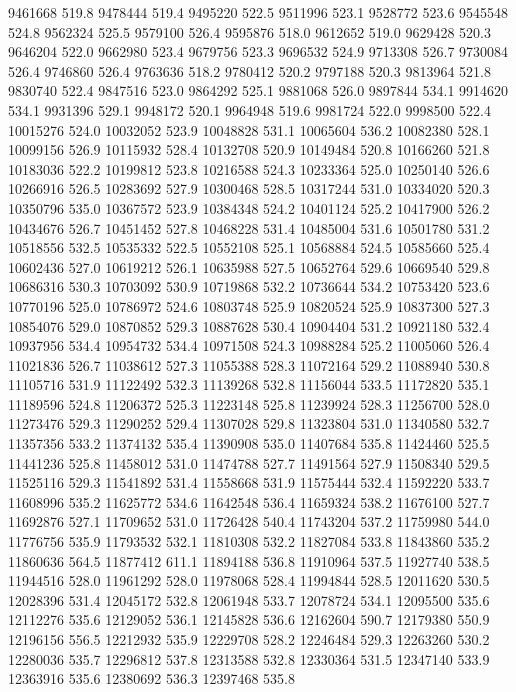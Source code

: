 9461668 519.8
9478444 519.4
9495220 522.5
9511996 523.1
9528772 523.6
9545548 524.8
9562324 525.5
9579100 526.4
9595876 518.0
9612652 519.0
9629428 520.3
9646204 522.0
9662980 523.4
9679756 523.3
9696532 524.9
9713308 526.7
9730084 526.4
9746860 526.4
9763636 518.2
9780412 520.2
9797188 520.3
9813964 521.8
9830740 522.4
9847516 523.0
9864292 525.1
9881068 526.0
9897844 534.1
9914620 534.1
9931396 529.1
9948172 520.1
9964948 519.6
9981724 522.0
9998500 522.4
10015276 524.0
10032052 523.9
10048828 531.1
10065604 536.2
10082380 528.1
10099156 526.9
10115932 528.4
10132708 520.9
10149484 520.8
10166260 521.8
10183036 522.2
10199812 523.8
10216588 524.3
10233364 525.0
10250140 526.6
10266916 526.5
10283692 527.9
10300468 528.5
10317244 531.0
10334020 520.3
10350796 535.0
10367572 523.9
10384348 524.2
10401124 525.2
10417900 526.2
10434676 526.7
10451452 527.8
10468228 531.4
10485004 531.6
10501780 531.2
10518556 532.5
10535332 522.5
10552108 525.1
10568884 524.5
10585660 525.4
10602436 527.0
10619212 526.1
10635988 527.5
10652764 529.6
10669540 529.8
10686316 530.3
10703092 530.9
10719868 532.2
10736644 534.2
10753420 523.6
10770196 525.0
10786972 524.6
10803748 525.9
10820524 525.9
10837300 527.3
10854076 529.0
10870852 529.3
10887628 530.4
10904404 531.2
10921180 532.4
10937956 534.4
10954732 534.4
10971508 524.3
10988284 525.2
11005060 526.4
11021836 526.7
11038612 527.3
11055388 528.3
11072164 529.2
11088940 530.8
11105716 531.9
11122492 532.3
11139268 532.8
11156044 533.5
11172820 535.1
11189596 524.8
11206372 525.3
11223148 525.8
11239924 528.3
11256700 528.0
11273476 529.3
11290252 529.4
11307028 529.8
11323804 531.0
11340580 532.7
11357356 533.2
11374132 535.4
11390908 535.0
11407684 535.8
11424460 525.5
11441236 525.8
11458012 531.0
11474788 527.7
11491564 527.9
11508340 529.5
11525116 529.3
11541892 531.4
11558668 531.9
11575444 532.4
11592220 533.7
11608996 535.2
11625772 534.6
11642548 536.4
11659324 538.2
11676100 527.7
11692876 527.1
11709652 531.0
11726428 540.4
11743204 537.2
11759980 544.0
11776756 535.9
11793532 532.1
11810308 532.2
11827084 533.8
11843860 535.2
11860636 564.5
11877412 611.1
11894188 536.8
11910964 537.5
11927740 538.5
11944516 528.0
11961292 528.0
11978068 528.4
11994844 528.5
12011620 530.5
12028396 531.4
12045172 532.8
12061948 533.7
12078724 534.1
12095500 535.6
12112276 535.6
12129052 536.1
12145828 536.6
12162604 590.7
12179380 550.9
12196156 556.5
12212932 535.9
12229708 528.2
12246484 529.3
12263260 530.2
12280036 535.7
12296812 537.8
12313588 532.8
12330364 531.5
12347140 533.9
12363916 535.6
12380692 536.3
12397468 535.8
